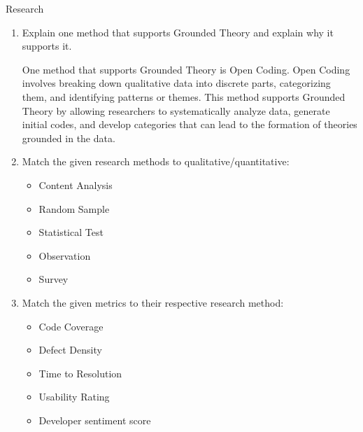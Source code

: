 \documentclass{article}
\begin{document}
\begin{exercise}{Research}
\begin{enumerate}
    \item Explain one method that supports Grounded Theory and explain why it supports it. \begin{solution}
        One method that supports Grounded Theory is Open Coding. Open Coding involves breaking down qualitative data into discrete parts, categorizing them, and identifying patterns or themes. This method supports Grounded Theory by allowing researchers to systematically analyze data, generate initial codes, and develop categories that can lead to the formation of theories grounded in the data.
      \end{solution}

    \item Match the given research methods to qualitative/quantitative:  \begin{itemize}
        \item Content Analysis 
        \item Random Sample 
        \item Statistical Test 
        \item Observation 
        \item Survey 
      \end{itemize}

    \item Match the given metrics to their respective research method: \begin{itemize}
        \item Code Coverage 
        \item Defect Density 
        \item Time to Resolution 
        \item Usability Rating 
        \item Developer sentiment score 
      \end{itemize}


\end{enumerate}
\end{exercise}
\end{document}
